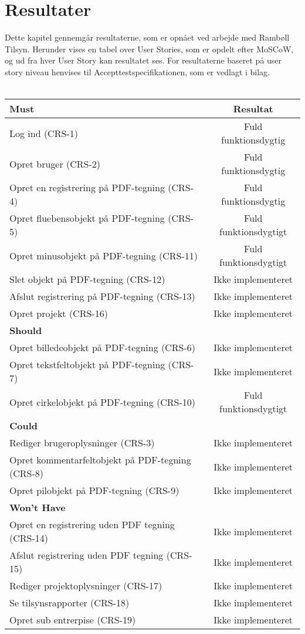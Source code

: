 \chapter{Resultater}
Dette kapitel gennemgår resultaterne, som er opnået ved arbejde med Rambøll Tilsyn. Herunder vises en tabel over User Stories, som er opdelt efter MoSCoW, og ud fra hver User Story kan resultatet ses.
For resultaterne baseret på user story niveau henvises til Accepttestspecifikationen, som er vedlagt i bilag. \\ \\
\begin{tabular}{ l | c  }
	\hline
	\textbf{Must} & \textbf{Resultat} \\ \hline
	Log ind (CRS-1) & Fuld funktionsdygtig \\
	\hline
	Opret bruger (CRS-2) & Fuld funktionsdygtig \\
	\hline
	Opret en registrering på PDF-tegning (CRS-4) & Fuld funktionsdygtig\\
	\hline
	Opret fluebensobjekt på PDF-tegning (CRS-5) & Fuld funktionsdygtigt\\
	\hline
	Opret minusobjekt på PDF-tegning (CRS-11) & Fuld funktionsdygtigt\\
	\hline
	Slet objekt på PDF-tegning (CRS-12) & Ikke implementeret\\
	\hline
	Afslut registrering på PDF-tegning (CRS-13) & Ikke implementeret\\
	\hline
	Opret projekt (CRS-16) & Ikke implementeret\\
	\hline
	\hline
	\textbf{Should} &  \\ \hline
	Opret billedeobjekt på PDF-tegning (CRS-6) & Ikke implementeret\\
	\hline
	Opret tekstfeltobjekt på PDF-tegning (CRS-7) & Ikke implementeret\\
	\hline
	Opret cirkelobjekt på PDF-tegning (CRS-10) & Fuld funktionsdygtigt\\
	\hline
	\hline
	\textbf{Could} &  \\ \hline
	Rediger brugeroplysninger (CRS-3) & Ikke implementeret\\
	\hline
	Opret kommentarfeltobjekt på PDF-tegning (CRS-8)  & Ikke implementeret\\
	\hline
	Opret pilobjekt på PDF-tegning (CRS-9) & Ikke implementeret\\
	\hline
	\hline
	\textbf{Won't Have} & \\ \hline
	Opret en registrering uden PDF tegning (CRS-14) & Ikke implementeret\\
	\hline
	Afslut registrering uden PDF tegning (CRS-15) & Ikke implementeret\\
	\hline
	Rediger projektoplysninger (CRS-17) & Ikke implementeret\\
	\hline
	Se tilsynsrapporter (CRS-18) & Ikke implementeret\\
	\hline
	Opret sub entrerpise (CRS-19) & Ikke implementeret\\
	\hline
\end{tabular} \\



